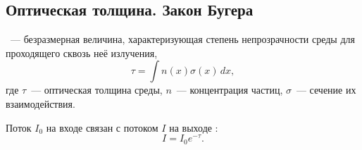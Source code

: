 \subsection{Оптическая толщина. Закон Бугера}
~--- безразмерная величина, характеризующая степень непрозрачности среды для проходящего сквозь неё излучения,
\begin{equation}
	\tau = \int n(x) \sigma(x)\,dx,
\end{equation}
где $\tau$~--- оптическая толщина среды, $n$~--- концентрация частиц, $\sigma$~--- сечение их взаимодействия.

Поток $I_0$ на входе связан с потоком $I$ на выходе :
\begin{equation}
	I = I_0 e^{-\tau}.
\end{equation}
